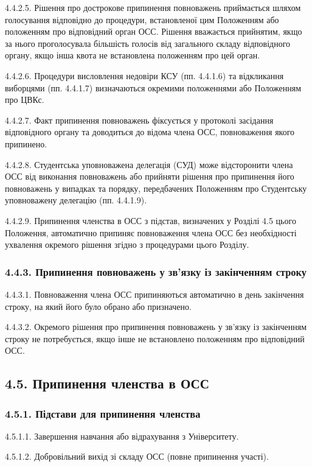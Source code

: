         4.4.2.5. Рішення про дострокове припинення повноважень приймається шляхом голосування відповідно до процедури, встановленої цим Положенням або положенням про відповідний орган ОСС. Рішення вважається прийнятим, якщо за нього проголосувала більшість голосів від загального складу відповідного органу, якщо інша квота не встановлена положенням про цей орган.

        4.4.2.6. Процедури висловлення недовіри КСУ (пп. 4.4.1.6) та відкликання виборцями (пп. 4.4.1.7) визначаються окремими положеннями або Положенням про ЦВКс.

        4.4.2.7. Факт припинення повноважень фіксується у протоколі засідання відповідного органу та доводиться до відома члена ОСС, повноваження якого припинено.

        4.4.2.8. Студентська уповноважена делегація (СУД) може відсторонити члена ОСС від виконання повноважень або прийняти рішення про припинення його повноважень у випадках та порядку, передбачених Положенням про Студентську уповноважену делегацію (пп. 4.4.1.9).

        4.4.2.9. Припинення членства в ОСС з підстав, визначених у Розділі 4.5 цього Положення, автоматично припиняє повноваження члена ОСС без необхідності ухвалення окремого рішення згідно з процедурами цього Розділу.
    \subsubsection*{4.4.3. Припинення повноважень у зв'язку із закінченням строку}
        4.4.3.1. Повноваження члена ОСС припиняються автоматично в день закінчення строку, на який його було обрано або призначено.

        4.4.3.2. Окремого рішення про припинення повноважень у зв'язку із закінченням строку не потребується, якщо інше не встановлено положенням про відповідний ОСС.

\subsection*{4.5. Припинення членства в ОСС}
    \subsubsection*{4.5.1. Підстави для припинення членства}
        4.5.1.1. Завершення навчання або відрахування з Університету.

        4.5.1.2. Добровільний вихід зі складу ОСС (повне припинення участі).

